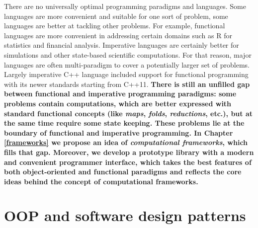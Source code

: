 \quad There are no universally optimal programming paradigms and languages. Some languages are more convenient and suitable for one sort of problem, some languages are better at tackling other problems. For example, functional languages are more convenient in addressing certain domains such as R for statistics and financial analysis. Imperative languages are certainly better for simulations and other state-based scientific computations. For that reason, major languages are often multi-paradigm to cover a potentially larger set of problems. Largely imperative C++ language included support for functional programming with its newer standards starting from C++11.\newline\null
\quad \textbf{There is still an unfilled gap between functional and imperative programming paradigms: some problems contain computations, which are better expressed with standard functional concepts (like \textit{maps}, \textit{folds}, \textit{reductions}, etc.), but at the same time require some state keeping. These problems lie at the boundary of functional and imperative programming. In Chapter \ref{frameworks} we propose an idea of \textit{computational frameworks}, which fills that gap. Moreover, we develop a prototype library \cite{frameworks-repo} with a modern and convenient programmer interface, which takes the best features of both object-oriented and functional paradigms and reflects the core ideas behind the concept of computational frameworks.}
\section{OOP and software design patterns}
\label{background_oop_design}
